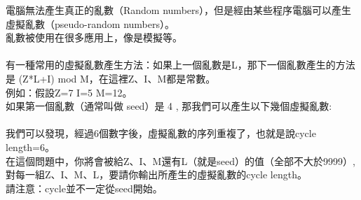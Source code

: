 電腦無法產生真正的亂數（Random numbers），但是經由某些程序電腦可以產生虛擬亂數（pseudo-random numbers）。\\
亂數被使用在很多應用上，像是模擬等。\\
\\
有一種常用的虛擬亂數產生方法：如果上一個亂數是L，那下一個亂數產生的方法是 (Z*L+I) mod M，在這裡Z、I、M都是常數。\\
例如：假設Z=7 I=5 M=12。\\
如果第一個亂數（通常叫做 seed）是 4 , 那我們可以產生以下幾個虛擬亂數:\\
\\
我們可以發現，經過6個數字後，虛擬亂數的序列重複了，也就是說cycle length=6。\\
 在這個問題中，你將會被給Z、I、M還有L（就是seed）的值（全部不大於9999）,對每一組Z、I、M、L，要請你輸出所產生的虛擬亂數的cycle length。\\
 請注意：cycle並不一定從seed開始。\\
